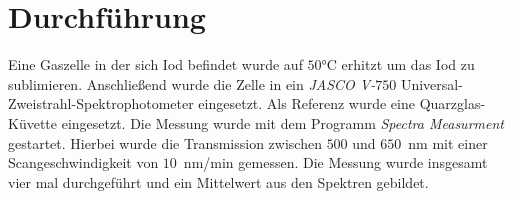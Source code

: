 \documentclass[12pt, letterpaper]{article}
\begin{document}
\section{Durchführung}

Eine Gaszelle in der sich Iod befindet wurde auf $50$°C erhitzt um das Iod zu sublimieren. Anschließend wurde die Zelle in ein \textit{JASCO V-$750$} Universal-Zweistrahl-Spektrophotometer eingesetzt. Als Referenz wurde eine Quarzglas-Küvette eingesetzt. Die Messung wurde mit dem Programm \textit{Spectra Measurment} gestartet. Hierbei wurde die Transmission zwischen $500$ und $650$~nm mit einer Scangeschwindigkeit von $10$~nm/min gemessen. Die Messung wurde insgesamt vier mal durchgeführt und ein Mittelwert aus den Spektren gebildet. 
\end{document}
